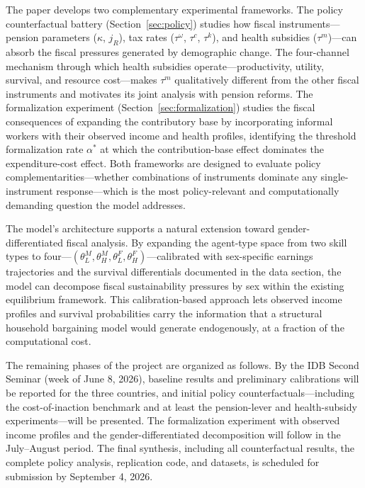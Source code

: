 \documentclass[12pt,a4paper]{article}
\begin{document}
The paper develops two complementary experimental frameworks. The policy counterfactual battery (Section~\ref{sec:policy}) studies how fiscal instruments---pension parameters ($\kappa$, $j_R$), tax rates ($\tau^\omega$, $\tau^c$, $\tau^k$), and health subsidies ($\tau^m$)---can absorb the fiscal pressures generated by demographic change. The four-channel mechanism through which health subsidies operate---productivity, utility, survival, and resource cost---makes $\tau^m$ qualitatively different from the other fiscal instruments and motivates its joint analysis with pension reforms. The formalization experiment (Section~\ref{sec:formalization}) studies the fiscal consequences of expanding the contributory base by incorporating informal workers with their observed income and health profiles, identifying the threshold formalization rate $\alpha^*$ at which the contribution-base effect dominates the expenditure-cost effect. Both frameworks are designed to evaluate policy complementarities---whether combinations of instruments dominate any single-instrument response---which is the most policy-relevant and computationally demanding question the model addresses.

The model's architecture supports a natural extension toward gender-differentiated fiscal analysis. By expanding the agent-type space from two skill types to four---$(\theta_L^M, \theta_H^M, \theta_L^F, \theta_H^F)$---calibrated with sex-specific earnings trajectories and the survival differentials documented in the data section, the model can decompose fiscal sustainability pressures by sex within the existing equilibrium framework. This calibration-based approach lets observed income profiles and survival probabilities carry the information that a structural household bargaining model would generate endogenously, at a fraction of the computational cost.

The remaining phases of the project are organized as follows. By the IDB Second Seminar (week of June 8, 2026), baseline results and preliminary calibrations will be reported for the three countries, and initial policy counterfactuals---including the cost-of-inaction benchmark and at least the pension-lever and health-subsidy experiments---will be presented. The formalization experiment with observed income profiles and the gender-differentiated decomposition will follow in the July--August period. The final synthesis, including all counterfactual results, the complete policy analysis, replication code, and datasets, is scheduled for submission by September 4, 2026.
\end{document}
